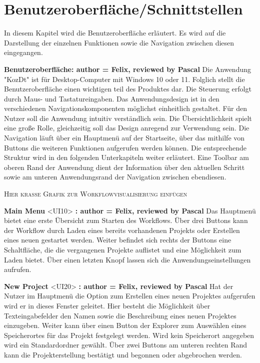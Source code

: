 \documentclass[parskip=full]{scrartcl} %
\begin{document}
\newpage



\section{Benutzeroberfläche/Schnittstellen}
In diesem Kapitel wird die Benutzeroberfläche erläutert. Es wird auf die Darstellung der einzelnen Funktionen sowie die Navigation zwischen diesen eingegangen.

\textbf{Benutzeroberfläche: author = Felix, reviewed by Pascal}
Die Anwendung "KozDt" ist für Desktop-Computer mit Windows 10 oder 11. Folglich stellt die Benutzeroberfläche einen wichtigen teil des Produktes dar.
Die Steuerung erfolgt durch Maus- und Tastatureingaben. Das Anwendungsdesign ist in den verschiedenen Navigationskomponenten möglichst einheitlich gestaltet. Für den Nutzer soll die Anwendung intuitiv verständlich sein. Die Übersichtlichkeit spielt eine große Rolle, gleichzeitig soll das Design anregend zur Verwendung sein.
Die Navigation läuft über ein Hauptmenü auf der Startseite, über das mithilfe von Buttons die weiteren Funktionen aufgerufen werden können. Die entsprechende Struktur wird in den folgenden Unterkapiteln weiter erläutert. Eine Toolbar am oberen Rand der Anwendung dient der Information über den aktuellen Schritt sowie am unteren Anwendungsrand der Navigation zwischen ebendiesen.

\textsc{Hier krasse Grafik zur Workflowvisualisierung einfügen}

\textbf{Main Menu }<UI10>\textbf{ : author = Felix, reviewed by Pascal}
Das Hauptmenü bietet eine erste Übersicht zum Starten des Workflows. Über drei Buttons kann der Workflow durch Laden eines bereits vorhandenen Projekts oder Erstellen eines neuen gestartet werden. Weiter befindet sich rechts der Buttons eine Schaltfläche, die die vergangenen Projekte auflistet und eine Möglichkeit zum Laden bietet. Über einen letzten Knopf lassen sich die Anwendungseinstellungen aufrufen.

\textbf{New Project }<UI20>\textbf{ : author = Felix, reviewed by Pascal}
Hat der Nutzer im Hauptmenü die Option zum Erstellen eines neuen Projektes aufgerufen wird er in dieses Fenster geleitet.
Hier besteht die Möglichkeit über Texteingabefelder den Namen sowie die Beschreibung eines neuen Projektes einzugeben. Weiter kann über einen Button der Explorer zum Auswählen eines Speicherortes für das Projekt festgelegt werden. Wird kein Speicherort angegeben wird ein Standardordner gewählt.
Über zwei Buttons am unteren rechten Rand kann die Projekterstellung bestätigt und begonnen oder abgebrochen werden.
\end{document}
